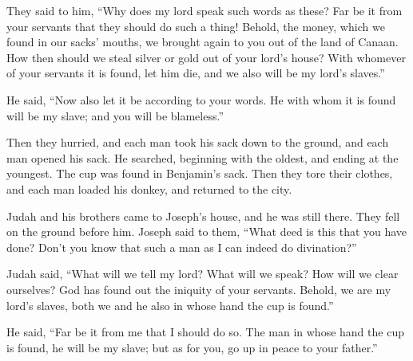  They said to him, ``Why does my lord speak such words as
these? Far be it from your servants that they should do such a thing!
 Behold, the money, which we found in our sacks' mouths,
we brought again to you out of the land of Canaan. How then should we
steal silver or gold out of your lord's house?  With
whomever of your servants it is found, let him die, and we also will be
my lord's slaves.''

 He said, ``Now also let it be according to your words.
He with whom it is found will be my slave; and you will be blameless.''

 Then they hurried, and each man took his sack down to
the ground, and each man opened his sack.  He searched,
beginning with the oldest, and ending at the youngest. The cup was found
in Benjamin's sack.  Then they tore their clothes, and
each man loaded his donkey, and returned to the city.

 Judah and his brothers came to Joseph's house, and he
was still there. They fell on the ground before him. 
Joseph said to them, ``What deed is this that you have done? Don't you
know that such a man as I can indeed do divination?''

 Judah said, ``What will we tell my lord? What will we
speak? How will we clear ourselves? God has found out the iniquity of
your servants. Behold, we are my lord's slaves, both we and he also in
whose hand the cup is found.''

 He said, ``Far be it from me that I should do so. The
man in whose hand the cup is found, he will be my slave; but as for you,
go up in peace to your father.''

